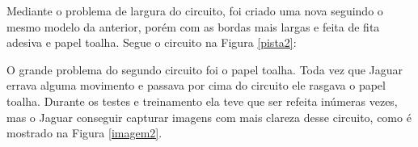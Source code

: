	\begin{figure}[H]
		\centering
\end{figure}


Mediante o problema de largura do circuito, foi criado uma nova seguindo o mesmo modelo da anterior, porém com as bordas mais largas e feita de fita adesiva e papel toalha. Segue o circuito na Figura \ref{pista2}:

	\begin{figure}[H]
		\centering
\end{figure}


O grande problema do segundo circuito foi o papel toalha. Toda vez que Jaguar errava alguma movimento e passava por cima do circuito ele rasgava o papel toalha. Durante os testes e treinamento ela teve que ser refeita inúmeras vezes, mas o Jaguar conseguir capturar imagens com mais clareza desse circuito, como é mostrado na Figura \ref{imagem2}. 

